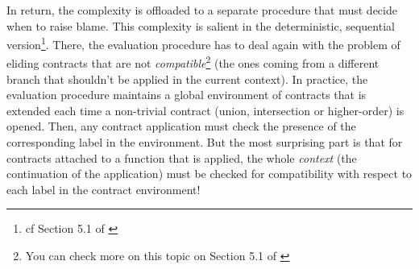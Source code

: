 \documentclass[sigplan,10pt,review,anonymous]{acmart}
\newcommand{\unsure}[2][1=]{}
\begin{document}
In return, the complexity is offloaded to a separate procedure that must decide
when to raise blame. This complexity is salient in the deterministic, sequential
version\footnote{cf Section 5.1 of \cite{KeilThiemannUnionIntersection}}. There,
the evaluation procedure has to deal again with the problem of eliding contracts
that are not \emph{compatible}\footnote{You can check more on this topic on
Section 5.1 of \cite{KeilThiemannUnionIntersection}} (the ones coming from a
different branch that shouldn't be applied in the current context). In practice,
the evaluation procedure maintains a global environment of contracts that is
extended each time a non-trivial contract (union, intersection or higher-order)
is opened. Then, any contract application must check the presence of the
corresponding label in the environment. But the most surprising part is that for contracts attached to a function that is applied,
the whole \emph{context} (the continuation of the application) must be checked
for compatibility with respect to each label in the contract
environment! 

\unsure{WARNING: what is below is being reworked by Yann}
\end{document}
